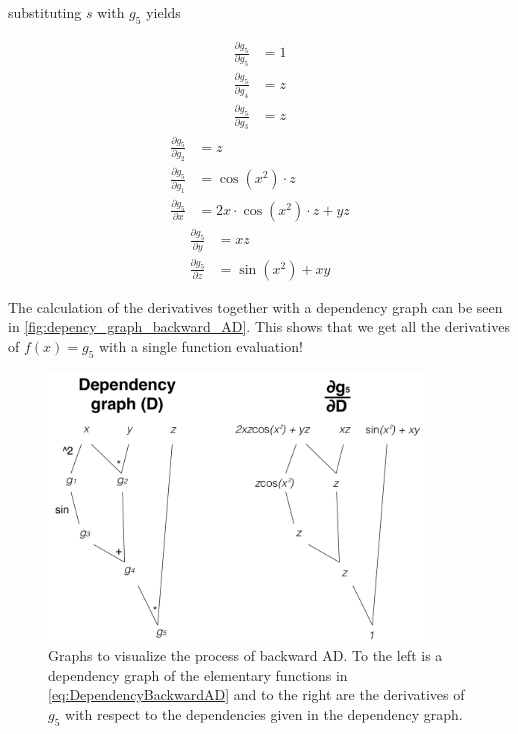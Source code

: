substituting $s$ with $g_5$ yields
\begin{multicols}{3}
    \noindent
    \begin{align*}
        \frac{\partial g_5}{\partial g_5} &= 1\\
        \frac{\partial g_5}{\partial g_4} &= z\\
        \frac{\partial g_5}{\partial g_3} &= z
    \end{align*}
    \begin{align*}
        \frac{\partial g_5}{\partial g_2} &= z\\
        \frac{\partial g_5}{\partial g_1} &= \cos(x^2)\cdot z\\
        \frac{\partial g_5}{\partial x}   &= 2x\cdot\cos(x^2)\cdot z + yz
    \end{align*}
    \begin{align*}
        \frac{\partial g_5}{\partial y}   &= xz\\
        \frac{\partial g_5}{\partial z}   &= \sin(x^2)+xy
    \end{align*}
\end{multicols}
The calculation of the derivatives together with a dependency graph can be seen in \autoref{fig:depency_graph_backward_AD}. This shows that we get all the derivatives of $f(x) = g_5$ with a single function evaluation!
\begin{figure}[htbp]
	\centering
	    \includegraphics[width=0.9\textwidth]{figures/dependency_graph_backward_AD.pdf}
	    \caption{Graphs to visualize the process of backward AD. To the left is a dependency graph of the elementary functions in \eqref{eq:DependencyBackwardAD} and to the right are the derivatives of $g_5$ with respect to the dependencies given in the dependency graph.}
	\label{fig:depency_graph_backward_AD}
\end{figure}
